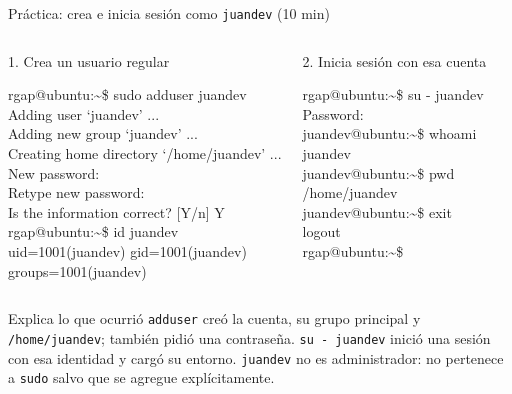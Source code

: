 \documentclass[aspectratio=169,10pt,c]{beamer}
\begin{document}
\begin{frame}{Práctica: crea e inicia sesión como \texttt{juandev} \textnormal{\small(10 min)}}
\begin{columns}[T,onlytextwidth]
\begin{exampleblock}{1. Crea un usuario regular}
\begin{terminal}\scriptsize
rgap@ubuntu:\textasciitilde\$ sudo adduser juandev\\
Adding user `juandev' ...\\
Adding new group `juandev' ...\\
Creating home directory `/home/juandev' ...\\
New password:\\
Retype new password:\\
Is the information correct? [Y/n] Y\\
rgap@ubuntu:\textasciitilde\$ id juandev\\
uid=1001(juandev) gid=1001(juandev)\\
groups=1001(juandev)
\end{terminal}
\end{exampleblock}
\begin{exampleblock}{2. Inicia sesión con esa cuenta}
\begin{terminal}\scriptsize
rgap@ubuntu:\textasciitilde\$ su - juandev\\
Password:\\
juandev@ubuntu:\textasciitilde\$ whoami\\
juandev\\
juandev@ubuntu:\textasciitilde\$ pwd\\
/home/juandev\\
juandev@ubuntu:\textasciitilde\$ exit\\
logout\\
rgap@ubuntu:\textasciitilde\$
\end{terminal}
\end{exampleblock}
\end{columns}
\begin{block}{Explica lo que ocurrió}
\footnotesize \texttt{adduser} creó la cuenta, su grupo principal y \texttt{/home/juandev}; también pidió una contraseña. \texttt{su - juandev} inició una sesión con esa identidad y cargó su entorno. \texttt{juandev} no es administrador: no pertenece a \texttt{sudo} salvo que se agregue explícitamente.
\end{block}
\end{frame}
\end{document}
